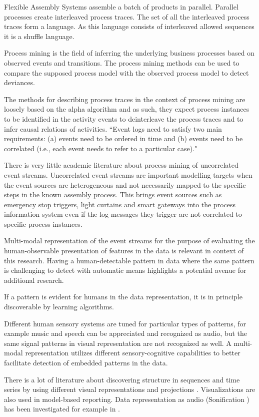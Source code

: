 \documentclass[a4paper,10pt]{article}
\begin{document}
Flexible Assembly Systems assemble a batch of products in parallel.
Parallel processes create interleaved process traces. The set of all the interleaved process traces form a language. As this language consists of interleaved allowed sequences
it is a shuffle language\cite{berglund2011recognizing}.

Process mining is the field of inferring the underlying business processes based on observed events and transitions. The process mining methods can be used
to compare the supposed process model with the observed process model to detect deviances.

The methods for describing process traces in the context of process mining are loosely based on the alpha algorithm\cite{van2004workflow} and as such, they expect process instances
to be identified in the activity events to deinterleave the process traces and to infer causal relations of activities.
``Event logs need to satisfy two main requirements: (a) events need to be ordered in time and (b) events need to be correlated
(i.e., each event needs to refer to a particular case)."\cite{van2011process}

There is very little academic literature about process mining of uncorrelated event streams. Uncorrelated event streams are important modelling targets when the event sources
are heterogeneous and not necessarily mapped to the specific steps in the known assembly process. This brings event sources such as emergency stop triggers, light curtains and
smart gateways into the process information system even if the log messages they trigger are not correlated to specific process instances.

Multi-modal representation of the event streams for the purpose of evaluating the human-observable presentation of features in the data is relevant in context of this research.
Having a human-detectable pattern in data where the same pattern is challenging to
detect with automatic means highlights a potential avenue for additional research.

If a pattern is evident for humans in the data representation, it is in principle discoverable by learning algorithms.

Different human sensory systems are tuned for particular types of patterns, for example music and speech
can be appreciated and recognized as audio, but the same signal patterns in visual representation are not recognized as well.
A multi-modal representation utilizes different sensory-cognitive capabilities to better facilitate detection of embedded patterns in the data.

There is a lot of literature about discovering structure in sequences and time series by using different visual representations and
projections \cite{hein2010recognition,misue2014chronoview}. Visualizations are also used in model-based reporting\cite{schuh2013ieee}.
Data representation as audio (Sonification \cite{refKra}) has been investigated for example in \cite{yeung1980pattern,kaper1999data}.



\end{document}

